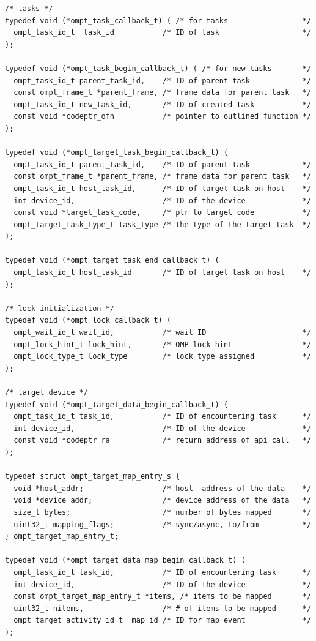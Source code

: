 \documentclass{article}
\begin{document}
{\begin{verbatim}
/* tasks */						    						    
typedef void (*ompt_task_callback_t) ( /* for tasks                 */	   
  ompt_task_id_t  task_id           /* ID of task                   */
);

typedef void (*ompt_task_begin_callback_t) ( /* for new tasks       */
  ompt_task_id_t parent_task_id,    /* ID of parent task            */
  const ompt_frame_t *parent_frame, /* frame data for parent task   */
  ompt_task_id_t new_task_id,       /* ID of created task           */
  const void *codeptr_ofn           /* pointer to outlined function */
);
  
typedef void (*ompt_target_task_begin_callback_t) (
  ompt_task_id_t parent_task_id,    /* ID of parent task            */
  const ompt_frame_t *parent_frame, /* frame data for parent task   */
  ompt_task_id_t host_task_id,      /* ID of target task on host    */
  int device_id,                    /* ID of the device             */
  const void *target_task_code,     /* ptr to target code           */
  ompt_target_task_type_t task_type /* the type of the target task  */
);

typedef void (*ompt_target_task_end_callback_t) ( 	   
  ompt_task_id_t host_task_id       /* ID of target task on host    */
);

/* lock initialization */
typedef void (*ompt_lock_callback_t) (
  ompt_wait_id_t wait_id,           /* wait ID                      */
  ompt_lock_hint_t lock_hint,       /* OMP lock hint                */
  ompt_lock_type_t lock_type        /* lock type assigned           */ 
);

/* target device */
typedef void (*ompt_target_data_begin_callback_t) ( 
  ompt_task_id_t task_id,           /* ID of encountering task      */
  int device_id,                    /* ID of the device             */
  const void *codeptr_ra            /* return address of api call   */
);

typedef struct ompt_target_map_entry_s {
  void *host_addr;                  /* host  address of the data    */
  void *device_addr;                /* device address of the data   */ 
  size_t bytes;                     /* number of bytes mapped       */
  uint32_t mapping_flags;           /* sync/async, to/from          */
} ompt_target_map_entry_t;

typedef void (*ompt_target_data_map_begin_callback_t) (
  ompt_task_id_t task_id,           /* ID of encountering task      */
  int device_id,                    /* ID of the device             */
  const ompt_target_map_entry_t *items, /* items to be mapped       */
  uint32_t nitems,                  /* # of items to be mapped      */
  ompt_target_activity_id_t  map_id /* ID for map event             */
);


\end{verbatim}}
\end{document}

